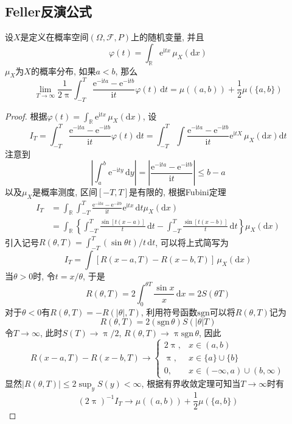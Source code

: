 \documentclass[cn, 12pt, math=mtpro2, bibstyle=apa, blue, twocol]{elegantbook}
\newcommand{\F}{\mathcal{F}}
\newcommand{\R}{\mathbb{R}}
\newcommand{\itx}{\text{e}^{\text{i}tX}}
\begin{document}
\subsection{Feller反演公式}
\begin{theorem}[Feller反演公式]
  设$X$是定义在概率空间$(\Omega,\F,P)$上的随机变量, 并且
  $$\varphi(t)=\int_\R \text{e}^{\text{i}tx}\,\mu_X(\text{d}x)$$
  $\mu_X$为$X$的概率分布, 如果$a<b$, 那么
  $$\lim_{T\to\infty}\frac{1}{2\uppi}\int_{-T}^{T}\frac{\text{e}^{-\text{i}ta}-\text{e}^{-\text{i}tb}}{\text{i}t}\varphi(t)\,\text{d}t=\mu((a,b))+\frac{1}{2}\mu(\{a,b\})$$

\end{theorem}
\begin{proof}
  根据$ \varphi(t)=\int_\R \text{e}^{\text{i}tx} \,\mu_X(\text{d}x)$, 设
  $$I_T=\int_{-T}^{T}\frac{\text{e}^{-\text{i}ta}-\text{e}^{-\text{i}tb}}{\text{i}t}\varphi(t)\,\text{d}t=\int_{-T}^{T}\int\frac{\text{e}^{-\text{i}ta}-\text{e}^{-\text{i}tb}}{\text{i}t}\itx\,\mu_X(\text{d}x)\text{d}t$$
  注意到
  $$\left|\int_{a}^{b}\text{e}^{-\text{i}ty}\,\text{d}y\right|=\left|\frac{\text{e}^{-\text{i}ta}-\text{e}^{-\text{i}tb}}{\text{i}t}\right|\leq b-a$$
  以及$\mu_X$是概率测度, 区间$[-T,T]$是有限的, 根据Fubini定理
  \begin{align*}
  I_T&=\int_\R\int_{-T}^{T}\frac{\text{e}^{-\text{i}ta}-\text{e}^{-\text{i}tb}}{\text{i}t}\text{e}^{\text{i}tx}\,\text{d}t\mu_X(\text{d}x) \\
  &=\int_\R\left\{\int_{-T}^{T}\frac{\sin[t(x-a)]}{t}\,\text{d}t-\int_{-T}^{T}\frac{\sin[t(x-b)]}{t}\,\text{d}t\right\}\mu_X(\text{d}x)
  \end{align*}
  引入记号$R(\theta,T)=\int_{-T}^{T}(\sin\theta t)/t\,\text{d}t$, 可以将上式简写为
  \begin{equation}\label{eq3.7}
    I_T=\int[R(x-a,T)-R(x-b,T)]\,\mu_X(\text{d}x)
  \end{equation}
  当$\theta>0$时, 令$t=x/\theta$, 于是
  $$R(\theta,T)=2\int_{0}^{\theta T}\frac{\sin x}{x}\,\text{d}x=2S(\theta T)$$
  对于$\theta<0$有$R(\theta,T)=-R(|\theta|,T)$, 利用符号函数$\text{sgn}$可以将$R(\theta,T)$记为
  $$R(\theta,T)=2(\text{sgn}\,\theta)S(|\theta|T)$$
  令$T\to\infty$, 此时$S(T)\to\uppi/2$, $R(\theta,T)\to\uppi\text{sgn}\,\theta$, 因此
  $$R(x-a,T)-R(x-b,T)\to\begin{cases}
                          2\uppi, & x\in(a,b) \\
                          \uppi, & x\in\{a\}\cup\{b\}\ \\
                          0, & x\in (-\infty,a)\cup (b,\infty)
                        \end{cases}$$
  显然$|R(\theta,T)|\leq 2\sup_yS(y)<\infty$, 根据有界收敛定理可知当$T\to\infty$时有
  $$(2\uppi)^{-1}I_T\to\mu((a,b))+\frac{1}{2}\mu(\{a,b\})$$
\end{proof}
\end{document}
